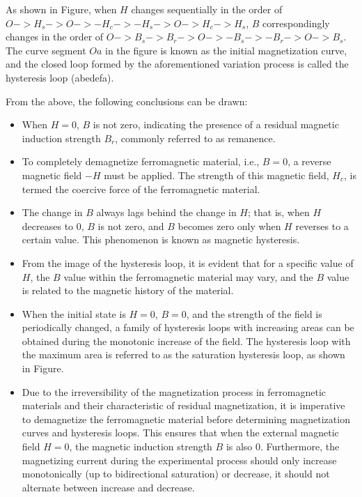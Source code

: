 \documentclass[UTF8]{article}
\begin{document}
   As shown in Figure, when $H$ changes sequentially in the order of $O->H_s->O->-H_c- >-H_s->O->H_c->H_s$, $B$ correspondingly changes in the order of $O->B_s->B_r->O->-B_s->-B_r->O- >B_s$. The curve segment $Oa$ in the figure is known as the initial magnetization curve, and the closed loop formed by the aforementioned variation process is called the hysteresis loop (abedefa). 
   
   From the above, the following conclusions can be drawn:
   
   \begin{itemize}
       \item When \(H = 0\), \(B\) is not zero, indicating the presence of a residual magnetic induction strength \(B_r\), commonly referred to as remanence.
       \item To completely demagnetize ferromagnetic material, i.e., \(B = 0\), a reverse magnetic field \(-H\) must be applied. The strength of this magnetic field, \(H_c\), is termed the coercive force of the ferromagnetic material.
       \item The change in \(B\) always lags behind the change in \(H\); that is, when \(H\) decreases to 0, \(B\) is not zero, and \(B\) becomes zero only when \(H\) reverses to a certain value. This phenomenon is known as magnetic hysteresis.
       \item From the image of the hysteresis loop, it is evident that for a specific value of \(H\), the \(B\) value within the ferromagnetic material may vary, and the \(B\) value is related to the magnetic history of the material.
       \item When the initial state is \(H = 0\), \(B = 0\), and the strength of the field is periodically changed, a family of hysteresis loops with increasing areas can be obtained during the monotonic increase of the field. The hysteresis loop with the maximum area is referred to as the saturation hysteresis loop, as shown in Figure.
       \item Due to the irreversibility of the magnetization process in ferromagnetic materials and their characteristic of residual magnetization, it is imperative to demagnetize the ferromagnetic material before determining magnetization curves and hysteresis loops. This ensures that when the external magnetic field $H = 0$, the magnetic induction strength $B$ is also $0$. Furthermore, the magnetizing current during the experimental process should only increase monotonically (up to bidirectional saturation) or decrease, it should not alternate between increase and decrease.
   \end{itemize}
   
\end{document}
